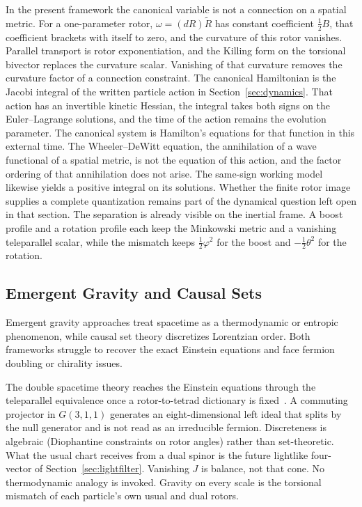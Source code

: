 \documentclass[a4paper]{article}
\begin{document}
In the present framework the canonical variable is not a connection on a spatial metric. For a one-parameter rotor, $\omega=(dR)\widetilde R$ has constant coefficient $\tfrac12 B$, that coefficient brackets with itself to zero, and the curvature of this rotor vanishes. Parallel transport is rotor exponentiation, and the Killing form on the torsional bivector replaces the curvature scalar. Vanishing of that curvature removes the curvature factor of a connection constraint. The canonical Hamiltonian is the Jacobi integral of the written particle action in Section~\ref{sec:dynamics}. That action has an invertible kinetic Hessian, the integral takes both signs on the Euler--Lagrange solutions, and the time of the action remains the evolution parameter. The canonical system is Hamilton's equations for that function in this external time. The Wheeler--DeWitt equation, the annihilation of a wave functional of a spatial metric, is not the equation of this action, and the factor ordering of that annihilation does not arise. The same-sign working model likewise yields a positive integral on its solutions. Whether the finite rotor image supplies a complete quantization remains part of the dynamical question left open in that section. The separation is already visible on the inertial frame. A boost profile and a rotation profile each keep the Minkowski metric and a vanishing teleparallel scalar, while the mismatch keeps $\tfrac12\varphi^2$ for the boost and $-\tfrac12\theta^2$ for the rotation.

\subsection{Emergent Gravity and Causal Sets}

Emergent gravity approaches treat spacetime as a thermodynamic or entropic phenomenon, while causal set theory discretizes Lorentzian order. Both frameworks struggle to recover the exact Einstein equations and face fermion doubling or chirality issues.

The double spacetime theory reaches the Einstein equations through the teleparallel equivalence once a rotor-to-tetrad dictionary is fixed~\cite{maluf2013}. A commuting projector in $G(3,1,1)$ generates an eight-dimensional left ideal that splits by the null generator and is not read as an irreducible fermion. Discreteness is algebraic (Diophantine constraints on rotor angles) rather than set-theoretic. What the usual chart receives from a dual spinor is the future lightlike four-vector of Section~\ref{sec:lightfilter}. Vanishing $J$ is balance, not that cone. No thermodynamic analogy is invoked. Gravity on every scale is the torsional mismatch of each particle's own usual and dual rotors.
\end{document}

